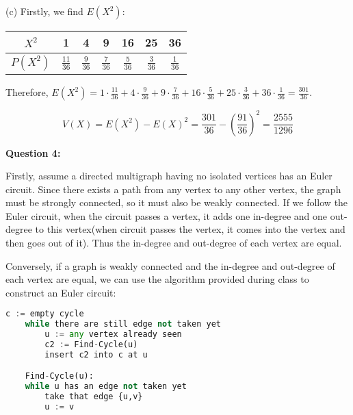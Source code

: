 \documentclass[a4paper,11pt]{article}
\begin{document}
\begin{spacing}{1.4}
    \vspace{10pt}

    (c) Firstly, we find $E(X^2)$:

    \begin{center}
        \begin{tabular}{c|c|c|c|c|c|c}
            \hline
            $X^2$ & 1 & 4 & 9 & 16 & 25 & 36\\\hline
            $P(X^2)$ & $\frac{11}{36}$ & $\frac{9}{36}$ & $\frac{7}{36}$&
            $\frac{5}{36}$ & $\frac{3}{36}$ & $\frac{1}{36}$\\\hline 
        \end{tabular}
    \end{center}
   
    Therefore, $\displaystyle
    E(X^2)=1\cdot \frac{11}{36}+4\cdot \frac{9}{36} +
    9\cdot \frac{7}{36} +16\cdot \frac{5}{36} 
    +25\cdot \frac{3}{36}+36\cdot \frac{1}{36}=\frac{301}{36}.$

    $$V(X)=E(X^2)-E(X)^2=\frac{301}{36}-\left( \frac{91}{36}\right)^2
    =\frac{2555}{1296}$$


    \vspace{20pt}

    \textbf{Question 4:}

    \hspace{2em}
    Firstly, assume a directed multigraph having no isolated vertices
    has an Euler circuit. Since there exists a path from any vertex
    to any other vertex, the graph must be strongly connected, 
    so it must also be weakly connected. If we follow the Euler circuit,
    when the circuit passes a vertex, it adds one in-degree and 
    one out-degree to this vertex(when circuit passes the vertex,
    it comes into the vertex and then goes out of it). Thus 
    the in-degree and out-degree of each vertex are equal.

    \hspace{2em}
    Conversely, if a graph is weakly connected and the in-degree
    and out-degree of each vertex are equal, we can use the 
    algorithm provided during class to construct an Euler circuit:

    \newpage
    \begin{tcolorbox}
        \begin{lstlisting}[language=Python]
    c := empty cycle
    while there are still edge not taken yet
        u := any vertex already seen
        c2 := Find-Cycle(u)
        insert c2 into c at u

    Find-Cycle(u):
    while u has an edge not taken yet
        take that edge {u,v}
        u := v
        \end{lstlisting}
    \end{tcolorbox}


\end{spacing}
\end{document}
